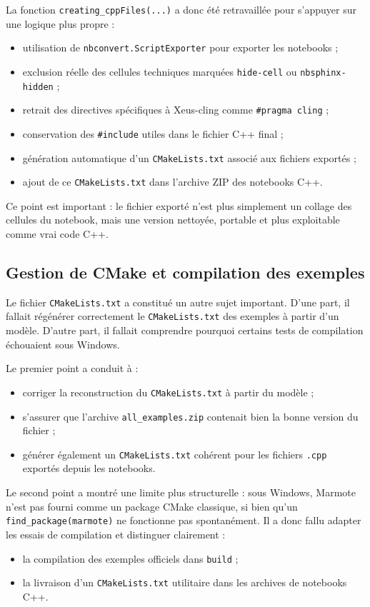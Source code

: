 \documentclass[a4paper,12pt,twoside]{article}
\begin{document}
La fonction \texttt{creating\_cppFiles(...)} a donc été retravaillée pour s'appuyer sur une logique plus propre :
\begin{itemize}
    \item utilisation de \texttt{nbconvert.ScriptExporter} pour exporter les notebooks ;
    \item exclusion réelle des cellules techniques marquées \texttt{hide-cell} ou \texttt{nbsphinx-hidden} ;
    \item retrait des directives spécifiques à Xeus-cling comme \texttt{\#pragma cling} ;
    \item conservation des \texttt{\#include} utiles dans le fichier C++ final ;
    \item génération automatique d'un \texttt{CMakeLists.txt} associé aux fichiers exportés ;
    \item ajout de ce \texttt{CMakeLists.txt} dans l'archive ZIP des notebooks C++.
\end{itemize}

Ce point est important : le fichier exporté n'est plus simplement un collage des cellules du notebook, mais une version nettoyée, portable et plus exploitable comme vrai code C++.

\subsection{Gestion de CMake et compilation des exemples}

Le fichier \texttt{CMakeLists.txt} a constitué un autre sujet important. D'une part, il fallait régénérer correctement le \texttt{CMakeLists.txt} des exemples à partir d'un modèle. D'autre part, il fallait comprendre pourquoi certains tests de compilation échouaient sous Windows.

Le premier point a conduit à :
\begin{itemize}
    \item corriger la reconstruction du \texttt{CMakeLists.txt} à partir du modèle ;
    \item s'assurer que l'archive \texttt{all\_examples.zip} contenait bien la bonne version du fichier ;
    \item générer également un \texttt{CMakeLists.txt} cohérent pour les fichiers \texttt{.cpp} exportés depuis les notebooks.
\end{itemize}

Le second point a montré une limite plus structurelle : sous Windows, Marmote n'est pas fourni comme un package CMake classique, si bien qu'un \texttt{find\_package(marmote)} ne fonctionne pas spontanément. Il a donc fallu adapter les essais de compilation et distinguer clairement :
\begin{itemize}
    \item la compilation des exemples officiels dans \texttt{build} ;
    \item la livraison d'un \texttt{CMakeLists.txt} utilitaire dans les archives de notebooks C++.
\end{itemize}
\end{document}
